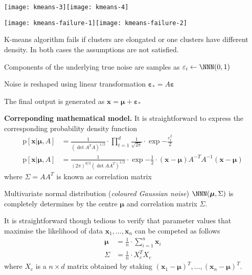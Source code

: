 \documentclass[landscape,footrule]{foils}
\newcommand{\pd}[1]{\mathrm{p}[#1]}
\renewcommand{\vec}[1]{\boldsymbol{#1}}
\begin{document}
\centerline{
\texttt{[image: kmeans-3]}\hspace*{-1.7cm}\texttt{[image: kmeans-4]}
\vspace*{-3.2cm}}


\centerline{\texttt{[image: kmeans-failure-1]}\hspace*{-1.7cm}\texttt{[image: kmeans-failure-2]}}
\vspace*{-2cm}

K-means algorithm fails if clusters are elongated or one clusters have different density. In both cases the assumptions are not satisfied. 



\begin{triangles}
\item Components of the underlying true noise  are samples as $\varepsilon_i\gets\NNN(0,1)$
\item Noise is reshaped using linear transformation $\vec{\varepsilon}_*=A\vec{\varepsilon}$
\item The final output is generated as $\vec{x}=\vec{\mu}+\vec{\varepsilon}_*$ 
\end{triangles}
\vspace*{1cm}


\textbf{Correponding mathematical model.} It is straightforward to express the corresponding probability density function
\begin{align*}
\pd{\vec{x}|\vec{\mu},A}&=\frac{1}{(\det A^TA)^{1/2}}\cdot\prod_{t=1}^d\frac{1}{\sqrt{2\pi}}\cdot\exp{-\frac{\varepsilon_t^2}{2}}\\
\pd{\vec{x}|\vec{\mu},A}&=\frac{1}{(2\pi)^{d/2}(\det AA^T)^{1/2}}\cdot\exp{-\frac{1}{2}\cdot (\vec{x}-\vec{\mu})A^{-T}A^{-1}(\vec{x}-\vec{\mu})}
\end{align*} 
where $\Sigma=AA^T$ is known as correlation matrix



Multivariate normal distribution (\emph{coloured Gaussian noise}) $\NNN(\vec{\mu}, \Sigma)$ is completely determines by the centre $\vec{\mu}$ and correlation matrix $\Sigma$. 

It is straightforward though tedious to verify that parameter values that maximise the likelihood of data $\vec{x}_1,\ldots,\vec{x}_n$ can be competed as follows
\begin{align*}
\vec{\mu}&=\frac{1}{n}\cdot\sum_{i=1}^n \vec{x}_i\\
\Sigma&=\frac{1}{n}\cdot X_c^T X_c
\end{align*}
where $X_c$ is a $n\times d$ matrix obtained by staking $(\vec{x}_1-\vec{\mu})^T,\ldots,(\vec{x}_n-\vec{\mu})^T$.
\end{document}
